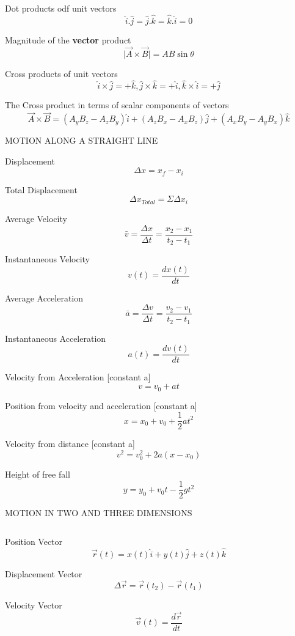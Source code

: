 \documentclass[12pt, letterpaper, twoside]{article}
\begin{document}
Dot products odf unit vectors
$$\hat{i} . \hat{j} = \hat{j} . \hat{k} = \hat{k} . \hat{i} = 0$$



Magnitude of the \textbf{vector} product
$$\mid \overrightarrow{A} \times \overrightarrow{B} \mid= AB \sin \theta$$



Cross products of unit vectors
$$\hat{i} \times \hat{j} =+ \hat{k}, \hat{j} \times \hat{k} = +\hat{i}, \hat{k} \times \hat{i} =+ \hat{j}$$
 



The Cross product in terms of scalar components of vectors
$$\overrightarrow{A} \times \overrightarrow{B} = (A_y B_z - A_z B_y) \hat{i} + (A_z B_x - A_x B_z) \hat{j} + (A_x B_y - A_y B_x) \hat{k}$$



\newpage

MOTION ALONG A STRAIGHT LINE
$$ $$



Displacement
$$\Delta x = x_f - x_i$$


Total Displacement
$$\Delta x_{Total} = \Sigma \Delta x_i$$

Average Velocity
$$\bar{v} = \frac{\Delta x}{\Delta t} = \frac{x_2 - x_1}{t_2 - t_1}$$

Instantaneous Velocity
$$v(t) = \frac{dx(t)}{dt}$$

Average Acceleration
$$\bar{a} = \frac{\Delta v}{\Delta t} = \frac{v_2 - v_1}{t_2 - t_1}$$

Instantaneous Acceleration
$$a(t) = \frac{dv(t)}{dt}$$

Velocity from Acceleration [constant a]
$$v = v_0 + at$$

Position from velocity and acceleration [constant a]
$$x = x_0 + v_0 + \frac{1}{2} a t^2$$

Velocity from distance [constant a]
$$v^2 = v_0^2 + 2a(x - x_0)$$

Height of free fall
$$y = y_0 + v_0 t - \frac{1}{2} g t^2$$


\newpage

MOTION IN TWO AND THREE DIMENSIONS

$$ $$  

Position Vector
$$\overrightarrow{r}(t) = x(t) \hat{i} + y(t) \hat{j} + z(t) \hat{k}$$


Displacement Vector
$$\Delta \overrightarrow{r}=\overrightarrow{r}(t_2) -  \overrightarrow{r}(t_1)$$


Velocity Vector
$$\overrightarrow{v}(t)= \frac{d \overrightarrow{r}}{dt}$$
\end{document}
